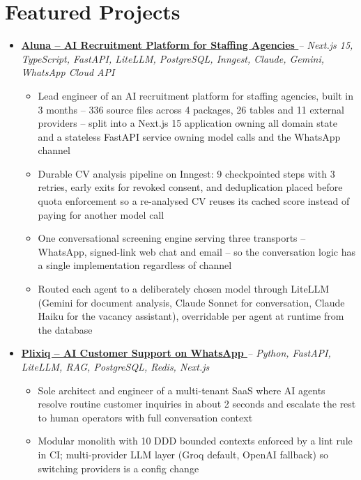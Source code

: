 \documentclass[letterpaper,10pt]{article}
\newcommand{\normalfaExternalLink}{{\mdseries\faExternalLink}}
\begin{document}
\section{Featured Projects}
\begin{itemize}[leftmargin=*, itemsep=2pt]
    \item \textbf{\href{https://www.aluna.works}{Aluna -- AI Recruitment Platform for Staffing Agencies \normalfaExternalLink}} \textit{-- Next.js 15, TypeScript, FastAPI, LiteLLM, PostgreSQL, Inngest, Claude, Gemini, WhatsApp Cloud API}
    \begin{itemize}[itemsep=0pt]
        \item Lead engineer of an AI recruitment platform for staffing agencies, built in 3 months -- 336 source files across 4 packages, 26 tables and 11 external providers -- split into a Next.js 15 application owning all domain state and a stateless FastAPI service owning model calls and the WhatsApp channel
        \item Durable CV analysis pipeline on Inngest: 9 checkpointed steps with 3 retries, early exits for revoked consent, and deduplication placed before quota enforcement so a re-analysed CV reuses its cached score instead of paying for another model call
        \item One conversational screening engine serving three transports -- WhatsApp, signed-link web chat and email -- so the conversation logic has a single implementation regardless of channel
        \item Routed each agent to a deliberately chosen model through LiteLLM (Gemini for document analysis, Claude Sonnet for conversation, Claude Haiku for the vacancy assistant), overridable per agent at runtime from the database
    \end{itemize}
    \item \textbf{\href{https://plixiq.com}{Plixiq -- AI Customer Support on WhatsApp \normalfaExternalLink}} \textit{-- Python, FastAPI, LiteLLM, RAG, PostgreSQL, Redis, Next.js}
    \begin{itemize}[itemsep=0pt]
        \item Sole architect and engineer of a multi-tenant SaaS where AI agents resolve routine customer inquiries in about 2 seconds and escalate the rest to human operators with full conversation context
        \item Modular monolith with 10 DDD bounded contexts enforced by a lint rule in CI; multi-provider LLM layer (Groq default, OpenAI fallback) so switching providers is a config change

\end{itemize}
\end{itemize}
\end{document}
